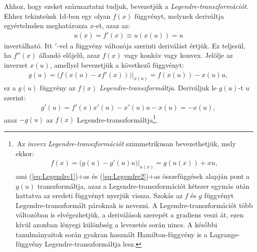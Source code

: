 Ahhoz, hogy ezeket származtatni tudjuk, bevezetjük a \emph{Legendre-transzformációt}. 
Ehhez tekintsünk 1d-ben egy olyan $f(x)$ függvényt, melynek deriváltja egyértelműen meghatározza $x$-et, azaz az:
\begin{align}\label{eq:Legendre1}
	u(x) = f'(x) \equiv u(x(u)) = u
\end{align}
invertálható. Itt $'$-vel a függvény változója szerinti deriválást értjük. Ez teljesül, ha $f''(x)$ állandó előjelű, azaz $f(x)$ vagy konkáv vagy konvex. Jelölje az inverzet $x(u)$, amellyel bevezetjük a következő függvényt:
\begin{align}\label{eq:Legendre2}
	g(u) = \big(f(x(u)-xf'(x)) \big)\Big|_{x(u)} = f(x(u))-x(u) u ,
\end{align}
ez a $g(u)$ függvény az $f(x)$ \emph{Legendre-transzformáltja}. Deriváljuk le $g(u)$-t $u$ szerint:
\begin{align}
	g'(u) = f'(x)x'(u)-x'(u)u - x(u) = -x(u),
\end{align}
azaz $-g(u)$ az $f(x)$ Legendre-transzformáltja\footnote{\,Az \emph{inverz Legendre-transzformációt} szimmetrikusan bevezethetjük, mely ekkor:
\begin{align}
	f(x) = \big(g(u)-g'(u)u \big)\Big|_{u(x)} =  g(u(x)) + xu,
\end{align}
ami \atold(\ref{eq:Legendre1})+as{} és \atold(\ref{eq:Legendre2})+as{} összefüggések alapján pont a $g(u)$ transzformáltja, azaz a Legendre-transzformációt kétszer egymás után hattatva az eredeti függvényt nyerjük vissza. Szokás az $f$ és $g$ függvényt Legendre-transzformált pároknak is nevezni. A Legendre-transzformációt több változóban is elvégezhetjük, a deriválások szerepét a gradiens veszi át, ezen kívül azonban lényegi különbség a levezetés során nincs. A későbbi tanulmányaitok során gyakran használt Hamilton\footnotemark-függvény is a Lagrange\footnotemark-függvény Legendre-transzformáltja lesz.}.
\addtocounter{footnote}{-1}


